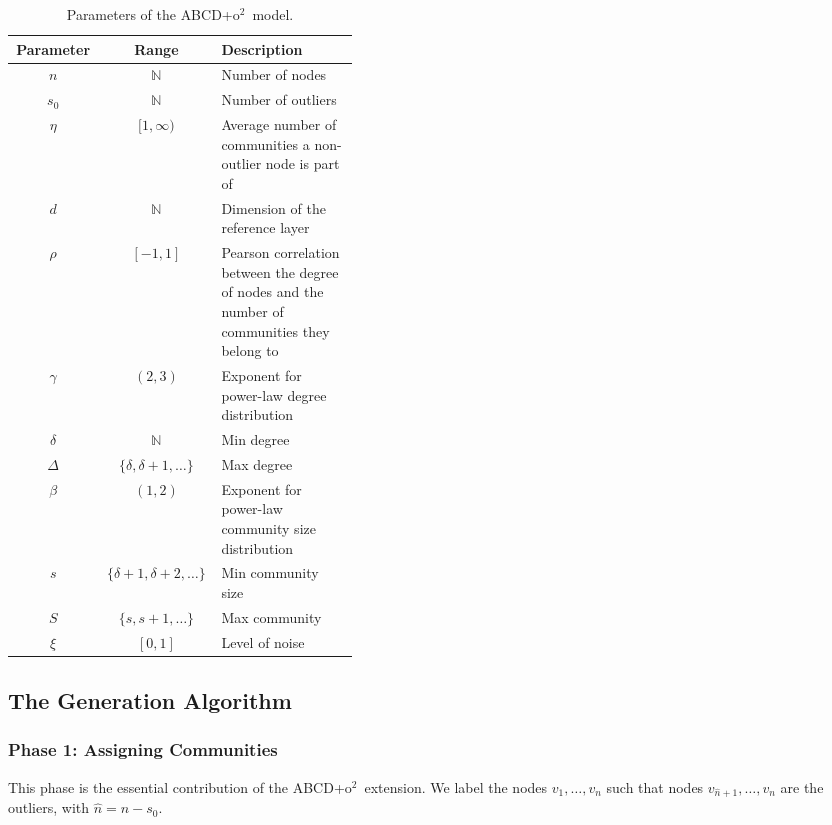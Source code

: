\documentclass[review,los,12pt]{ryethesis}
\newcommand{\N}{{\mathbb N}}
\newcommand{\abcdoo}{{ABCD+o$^2$}}
\begin{document}
\begin{table}
\centering
\begin{tabular}{|c|c|p{0.4\linewidth}|}
\hline
Parameter & Range & Description\\ \hline
$n$ & $\N$ & Number of nodes \\
$s_0$ & $\N$ & Number of outliers \\
$\eta$ & $[1,\infty)$ & Average number of communities a non-outlier node is part of \\
$d$ & $\N$ & Dimension of the reference layer \\
$\rho$ & $[-1,1]$ & Pearson correlation between the degree of nodes and the number of communities they belong to \\
\hline
$\gamma$ & $(2,3)$ & Exponent for power-law degree distribution \\
$\delta$ & $\N$ & Min degree \\
$\Delta$ & $\{ \delta, \delta+1, \ldots \}$ & Max degree \\
\hline
$\beta$ & $(1,2)$ & Exponent for power-law community size distribution\\
$s$ & $\{ \delta+1, \delta+2, \ldots \}$ & Min community size \\
$S$ & $\{ s, s+1, \ldots \}$ & Max community \\
\hline
$\xi$ & $[0,1]$ & Level of noise \\
\hline
\end{tabular}
\medskip
\caption{Parameters of the \abcdoo\ model.\label{tab:parameters}}
\end{table}

\subsection{The Generation Algorithm}\label{sec:abcdoo_construction}

\subsubsection*{Phase 1: Assigning Communities}
This phase is the essential contribution of the \abcdoo\ extension. 
We label the nodes $v_1, \dots, v_n$ such that nodes $v_{\hat{n}+1}, \dots, v_n$ are the outliers, with $\hat{n} = n - s_0$.
\end{document}

